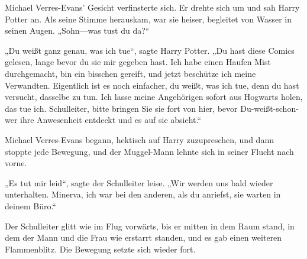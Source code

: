 Michael Verres-Evans’ Gesicht verfinsterte sich. Er drehte sich um und sah Harry Potter an. Als seine Stimme herauskam, war sie heiser, begleitet von Wasser in seinen Augen. „Sohn—was tust du da?“

„Du weißt ganz genau, was ich tue“, sagte Harry Potter. „Du hast diese Comics gelesen, lange bevor du sie mir gegeben hast. Ich habe einen Haufen Mist durchgemacht, bin ein bisschen gereift, und jetzt beschütze ich meine Verwandten. Eigentlich ist es noch einfacher, du weißt, was ich tue, denn du hast versucht, dasselbe zu tun. Ich lasse meine Angehörigen sofort aus Hogwarts holen, das tue ich. Schulleiter, bitte bringen Sie sie fort von hier, bevor Du-weißt-schon-wer ihre Anwesenheit entdeckt und es auf sie absieht.“

Michael Verres-Evans begann, hektisch auf Harry zuzupreschen, und dann stoppte jede Bewegung, und der Muggel-Mann lehnte sich in seiner Flucht nach vorne.

„Es tut mir leid“, sagte der Schulleiter leise. „Wir werden uns bald wieder unterhalten. Minerva, ich war bei den anderen, als du anriefst, sie warten in deinem Büro.“


Der Schulleiter glitt wie im Flug vorwärts, bis er mitten in dem Raum stand, in dem der Mann und die Frau wie erstarrt standen, und es gab einen weiteren Flammenblitz. Die Bewegung setzte sich wieder fort.

